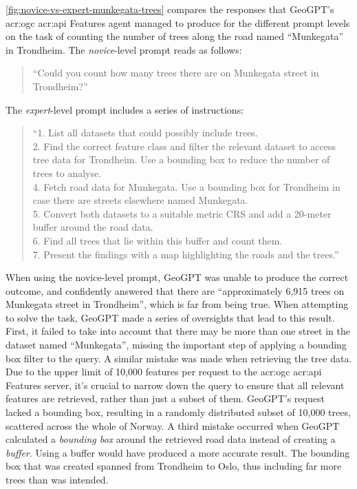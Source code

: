 \autoref{fig:novice-vs-expert-munkegata-trees} compares the responses that GeoGPT's \acrshort{acr:ogc} \acrshort{acr:api} Features agent managed to produce for the different prompt levels on the task of counting the number of trees along the road named \enquote{Munkegata} in Trondheim. The \textit{novice}-level prompt reads as follows:

\begin{quote}
    \enquote{Could you count how many trees there are on Munkegata street in Trondheim?}
\end{quote}

\noindent The \textit{expert}-level prompt includes a series of instructions:

\begin{quote}
    \enquote{1. List all datasets that could possibly include trees. \\
        2. Find the correct feature class and filter the relevant dataset to access tree data for Trondheim. Use a bounding box to reduce the number of trees to analyse. \\
        4. Fetch road data for Munkegata. Use a bounding box for Trondheim in case there are streets elsewhere named Munkegata. \\
        5. Convert both datasets to a suitable metric CRS and add a 20-meter buffer around the road data. \\
        6. Find all trees that lie within this buffer and count them. \\
        7. Present the findings with a map highlighting the roads and the trees.}
\end{quote}

\FloatBarrier

When using the novice-level prompt, GeoGPT was unable to produce the correct outcome, and confidently answered that there are \enquote{approximately 6,915 trees on Munkegata street in Trondheim}, which is far from being true. When attempting to solve the task, GeoGPT made a series of oversights that lead to this result. First, it failed to take into account that there may be more than one street in the dataset named \enquote{Munkegata}, missing the important step of applying a bounding box filter to the query. A similar mistake was made when retrieving the tree data. Due to the upper limit of 10,000 features per request to the \acrshort{acr:ogc} \acrshort{acr:api} Features server, it's crucial to narrow down the query to ensure that all relevant features are retrieved, rather than just a subset of them. GeoGPT's request lacked a bounding box, resulting in a randomly distributed subset of 10,000 trees, scattered across the whole of Norway. A third mistake occurred when GeoGPT calculated a \textit{bounding box} around the retrieved road data instead of creating a \textit{buffer}. Using a buffer would have produced a more accurate result. The bounding box that was created spanned from Trondheim to Oslo, thus including far more trees than was intended.

